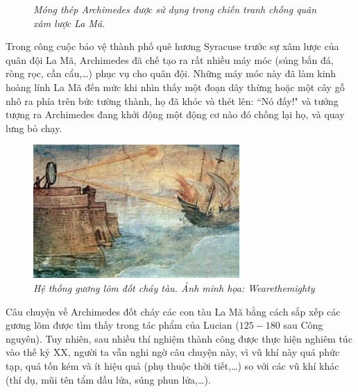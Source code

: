 \begin{multicols}{2}
\begin{figure}[H]
		\caption{\small\textit{\color{lichsutoanhoc}Móng thép Archimedes được sử dụng trong chiến tranh chống quân xâm lược La Mã.}}
		\vspace*{-10pt}
	\end{figure}
	Trong công cuộc bảo vệ thành phố quê hương Syracuse trước sự xâm lược của quân đội La Mã, Archimedes đã chế tạo ra rất nhiều máy móc (súng bắn đá, ròng rọc, cần cẩu,\ldots) phục vụ cho quân đội. Những máy móc này đã làm kinh hoàng lính La Mã đến mức khi nhìn thấy một đoạn dây thừng hoặc một cây gỗ nhô ra phía trên bức tường thành, họ đã khóc và thét lên: ``Nó đấy!" và tưởng tượng ra Archimedes đang khởi động một động cơ nào đó chống lại họ, và quay lưng bỏ chạy.
	\begin{figure}[H]
		\vspace*{-5pt}
		\centering
		\captionsetup{labelformat= empty, justification=centering}
		\includegraphics[width= 1\linewidth]{4}
		\caption{\small\textit{\color{lichsutoanhoc}Hệ thống gương lõm đốt cháy tàu. 
				Ảnh minh họa: Wearethemighty}}
		\vspace*{-5pt}
	\end{figure}
	Câu chuyện về Archimedes đốt cháy các con tàu La Mã bằng cách sắp xếp các gương lõm được tìm thấy trong tác phẩm của Lucian ($125-180$ sau Công nguyên). Tuy nhiên, sau nhiều thí nghiệm thành công được thực hiện nghiêm túc vào thế kỷ XX, người ta vẫn nghi ngờ câu chuyện này, vì vũ khí này quá phức tạp, quá tốn kém và ít hiệu quả (phụ thuộc thời tiết,\ldots) so với các vũ khí khác (thí dụ, mũi tên tẩm dầu lửa, súng phun lửa,\ldots). 
	\begin{figure}[H]
		\vspace*{-5pt}
		\centering
		\captionsetup{labelformat= empty, justification=centering}

\end{figure}
\end{multicols}
